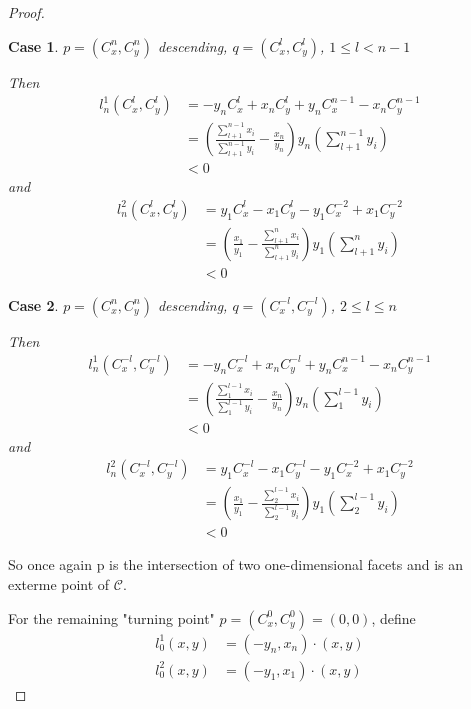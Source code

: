 \documentclass{article}
\theoremstyle{case}
\newtheorem{case}{Case}
\begin{document}
\begin{proof}
%
%
\setcounter{case}{0}
\begin{case} $p = \left( C_x^n, C_y^n \right)$ descending, $q = \left( C_x^l, C_y^l\right)$, $1 \leq l < n-1$

\noindent Then
\begin{align*}
l_n^1\left( C_x^l, C_y^l\right) &= -y_nC_x^l + x_nC_y^l + y_nC_x^{n-1} - x_nC_y^{n-1} \\
&= \left( \frac{\sum_{l+1}^{n-1}x_i}{\sum_{l+1}^{n-1}y_i} - \frac{x_n}{y_n}\right) y_n\left( \sum_{l+1}^{n-1}y_i\right) \\
&< 0
\end{align*}
and
\begin{align*}
l_n^2\left( C_x^l, C_y^l\right) &= y_1C_x^l - x_1C_y^l - y_1C_x^{-2} + x_1C_y^{-2} \\
&= \left( \frac{x_1}{y_1} - \frac{\sum_{l+1}^n x_i}{\sum_{l+1}^n y_i}\right)y_1\left( \sum_{l+1}^n y_i\right) \\
&< 0
\end{align*}
\end{case}

\begin{case} $p = \left( C_x^n, C_y^n \right)$ descending, $q = \left( C_x^{-l}, C_y^{-l}\right)$, $2 \leq l \leq n$

\noindent Then
\begin{align*}
l_n^1\left( C_x^{-l},C_y^{-l}\right) &= -y_nC_x^{-l} + x_nC_y^{-l} + y_nC_x^{n-1} - x_nC_y^{n-1} \\
&= \left( \frac{\sum_1^{l-1}x_i}{\sum_1^{l-1}y_i} - \frac{x_n}{y_n}\right) y_n\left( \sum_1^{l-1}y_i\right) \\
&< 0
\end{align*}
and
\begin{align*}
l_n^2\left( C_x^{-l},C_y^{-l}\right) &= y_1C_x^{-l} -x_1C_y^{-l} - y_1C_x^{-2} + x_1C_y^{-2} \\
&= \left( \frac{x_1}{y_1} - \frac{\sum_2^{l-1}x_i}{\sum_2^{l-1}y_i}\right)y_1\left( \sum_2^{l-1}y_i\right) \\
&< 0
\end{align*}
\end{case}

So once again p is the intersection of two one-dimensional facets and is an exterme point of $\mathcal{C}$.

For the remaining "turning point" $p = \left( C_x^0, C_y^0\right) = \left( 0, 0\right)$, define
\begin{align*}
l_0^1\left( x,y\right) &= \left( -y_n, x_n\right) \cdot \left( x,y\right)\\
l_0^2\left( x,y\right) &= \left( -y_1, x_1\right) \cdot \left( x,y\right)
\end{align*}


\end{proof}
\end{document}
